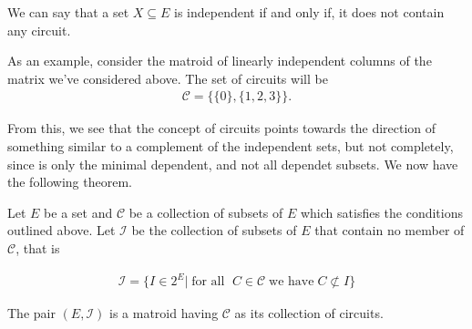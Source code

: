 We can say that a set $X \subseteq E$ is independent if and only if, it does not contain any circuit.

As an example, consider the matroid of linearly independent columns of the matrix we've considered above. The set of circuits will be
\begin{align*}
    \mathcal C = \{\{0\}, \{1, 2, 3\}\}.
\end{align*}

From this, we see that the concept of circuits points towards the direction of something similar to a complement of the independent sets, but not completely, since is only the minimal dependent, and not all dependet subsets. We now have the following theorem.

\begin{theorem}\label{thm:matroid-circuit-definition}
Let $E$ be a set and $\mathcal C$ be a collection of subsets of $E$ which satisfies the conditions outlined above. Let  $\mathcal I$  be the collection of subsets of $E$ that contain no member of $\mathcal C$, that is 

\begin{align}
   \mathcal{I} = \{I \in 2^E |\; \text{for all } \; C \in \mathcal{C}\; \text{we have} \; C \not\subset I\}
    \label{independent-sets-from-circuits}
\end{align}

    The pair $(E,\mathcal I)$ is a matroid having $\mathcal C$ as its collection of circuits.
\end{theorem}

